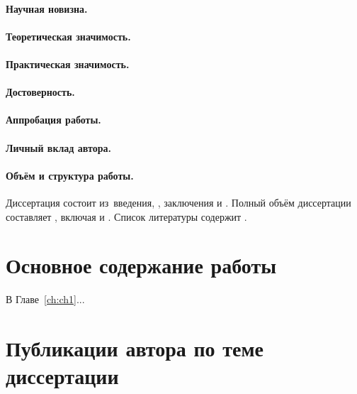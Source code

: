 \paragraph*{Научная новизна.}

\paragraph*{Теоретическая значимость.}
\paragraph*{Практическая значимость.}
\paragraph*{Достоверность.}
\paragraph*{Аппробация работы.}
\paragraph*{Личный вклад автора.}


\paragraph*{Объём и структура работы.}
Диссертация состоит из~введения,
,
заключения и
.
%
Полный объём диссертации составляет
, включая
 и
.
Список литературы содержит
.




\newpage
\section*{Основное содержание работы}

В Главе~\ref{ch:ch1}...

\section*{Публикации автора по теме диссертации}


